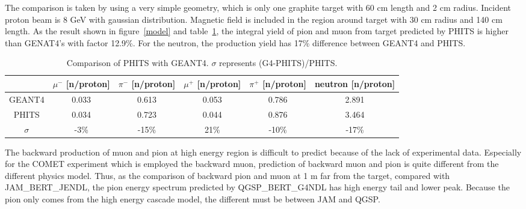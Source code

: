 The comparison is taken by using a very simple geometry, which is only one graphite target with 60 cm length and 2 cm radius.
Incident proton beam is 8 GeV with gaussian distribution.
Magnetic field is included in the region around target with 30 cm radius and 140 cm length.
As the result shown in figure~\ref{model} and table~\ref{2model}, the integral yield of pion and muon from target predicted by PHITS is higher than GENAT4's with factor 12.9\%.
For the neutron, the production yield has 17\% difference between GEANT4 and PHITS.
\begin{table}[H]
 \centering
 \begin{tabular}{cccccc} \hline \hline
  & $\mu^-$ [n/proton] & $\pi^-$ [n/proton] & $\mu^+$ [n/proton] & $\pi^+$ [n/proton] & neutron [n/proton] \\ \hline
  GEANT4 & 0.033 & 0.613 & 0.053 & 0.786 & 2.891 \\
  PHITS & 0.034 & 0.723 & 0.044 & 0.876 & 3.464 \\ \hline
  $\sigma$ & -3\% & -15\% & 21\% & -10\% & -17\% \\ \hline \hline
 \end{tabular}
 \caption{Comparison of PHITS with GEANT4. $\sigma$ represents (G4-PHITS)/PHITS.}
 \label{2model}
\end{table}
The backward production of muon and pion at high energy region is difficult to predict because of the lack of experimental data.
Especially for the COMET experiment which is employed the backward muon, prediction of backward muon and pion is quite different from the different physics model.
Thus, as the comparison of backward pion and muon at 1 m far from the target, compared with JAM\_BERT\_JENDL, the pion energy spectrum predicted by QGSP\_BERT\_G4NDL has high energy tail and lower peak.
Because the pion only comes from the high energy cascade model, the different must be between JAM and QGSP.
